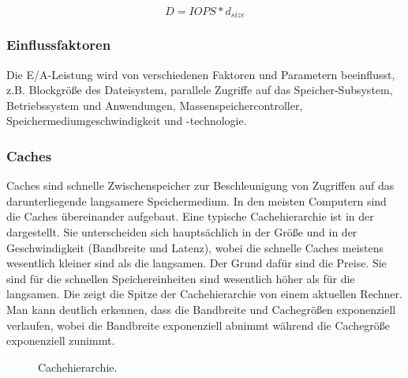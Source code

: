 \begin{equation}
	D = IOPS * d_{size}
\end{equation}



\subsubsection{Einflussfaktoren}
Die E/A-Leistung wird von verschiedenen Faktoren und Parametern beeinflusst, z.B. Blockgröße des Dateisystem, parallele Zugriffe auf das Speicher-Subsystem, Betriebssystem und Anwendungen, Massenspeichercontroller, Speichermediumgeschwindigkeit und -technologie.






\subsubsection{Caches}
Caches sind schnelle Zwischenspeicher zur Beschleunigung von Zugriffen auf das darunterliegende langsamere Speichermedium. 
In den meisten Computern sind die Caches übereinander aufgebaut.
Eine typische Cachehierarchie ist in der  dargestellt.
Sie unterscheiden sich hauptsächlich in der Größe und in der Geschwindigkeit (Bandbreite und Latenz), wobei die schnelle Caches meistens wesentlich kleiner sind als die langsamen.
Der Grund dafür sind die Preise.
Sie sind für die schnellen Speichereinheiten sind wesentlich höher als für die langsamen.
Die  zeigt die Spitze der Cachehierarchie von einem aktuellen Rechner.
Man kann deutlich erkennen, dass die Bandbreite und Cachegrößen exponenziell verlaufen, wobei die Bandbreite exponenziell abnimmt während die Cachegröße exponenziell zunimmt.

\begin{figure}[ht]
	\centering
	
	\caption{Cachehierarchie.}
	\label{fig:bas:cachehier}
\end{figure}


